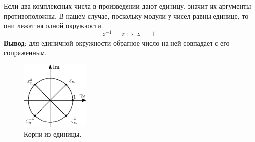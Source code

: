 \documentclass[12pt]{article}
\theoremstyle{definition}
\newcommand{\ovl}[1]{\overline{#1}}
\begin{document}
Если два комплексных числа в произведении дают единицу, значит их аргументы противоположны. В нашем случае, поскольку модули у чисел равны единице, то они лежат на одной окружности.
$$
	z^{-1} = \ovl{z} \Leftrightarrow |z| = 1
$$
\textbf{Вывод}: для единичной окружности обратное число на ней совпадает с его сопряженным.

\begin{figure}[H]
	\centering
	\includegraphics[width=0.3\textwidth]{AL1S3_2.eps}
	\caption{Корни из единицы.}
	\label{AL1S3_2}
\end{figure}
\end{document}
